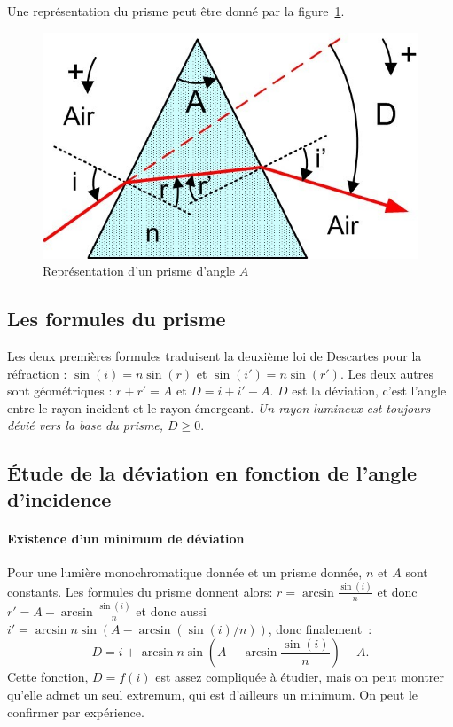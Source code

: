 Une représentation du prisme peut être donné par la figure~\ref{fig:prisme}.
\begin{figure}%
    \centering
    \includegraphics[scale=1.0]{./prisme.jpg}
    \caption{Représentation d'un prisme d'angle \(A\)}\label{fig:prisme}%
\end{figure}%

\subsection{Les formules du prisme}%
\label{chap6-subsec:formulesprisme}%

Les deux premières formules traduisent la deuxième loi de Descartes pour la 
réfraction : \(\sin(i) = n\sin(r)\) et \(\sin(i') = n\sin(r')\). Les deux 
autres sont géométriques : \(r+r'=A\) et \(D=i+i'-A\). \(D\) est la déviation, 
c'est l'angle entre le rayon incident et le rayon émergeant. \emph{Un rayon 
lumineux est toujours dévié vers la base du prisme, \(D \geq 0\)}.

\subsection{Étude de la déviation en fonction de l'angle d'incidence}%
\label{chap6-subsec:etudedeviation}%
\paragraph{Existence d'un minimum de déviation}%

Pour une lumière monochromatique donnée et un prisme donnée, \(n\) et \(A\) 
sont constants. Les formules du prisme donnent alors:
\(r = \arcsin{\frac{\sin(i)}{n}}\) et donc \(r'=A - 
\arcsin{\frac{\sin(i)}{n}}\) et donc aussi \(i' = \arcsin n\sin 
(A-\arcsin(\sin(i)/n))\), donc finalement~:
\begin{equation}%
  D = i + \arcsin{n\sin\left(A-\arcsin{\frac{\sin(i)}{n}}\right)} -A.
\end{equation}%
Cette fonction, \(D=f(i)\) est assez compliquée à étudier, mais on peut montrer 
qu'elle admet un seul extremum, qui est d'ailleurs un minimum. On peut le 
confirmer par expérience.

